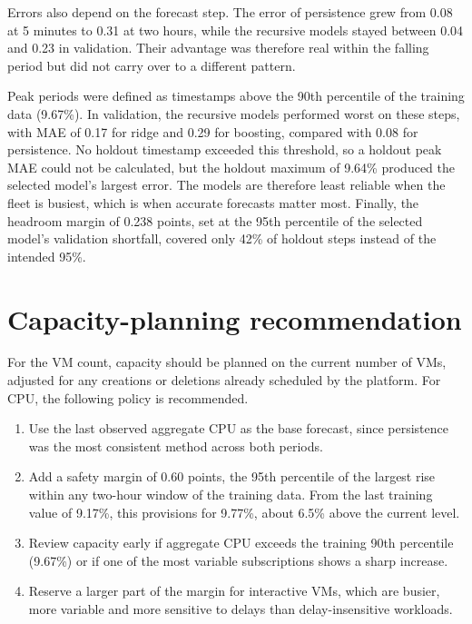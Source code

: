\documentclass[11pt,a4paper]{article}
\begin{document}
Errors also depend on the forecast step. The error of persistence grew from 0.08 at 5 minutes to 0.31 at two hours, while the recursive models stayed between 0.04 and 0.23 in validation. Their advantage was therefore real within the falling period but did not carry over to a different pattern.

Peak periods were defined as timestamps above the 90th percentile of the training data (9.67\%). In validation, the recursive models performed worst on these steps, with MAE of 0.17 for ridge and 0.29 for boosting, compared with 0.08 for persistence. No holdout timestamp exceeded this threshold, so a holdout peak MAE could not be calculated, but the holdout maximum of 9.64\% produced the selected model's largest error. The models are therefore least reliable when the fleet is busiest, which is when accurate forecasts matter most. Finally, the headroom margin of 0.238 points, set at the 95th percentile of the selected model's validation shortfall, covered only 42\% of holdout steps instead of the intended 95\%.

\section{Capacity-planning recommendation}

For the VM count, capacity should be planned on the current number of VMs, adjusted for any creations or deletions already scheduled by the platform. For CPU, the following policy is recommended.

\begin{enumerate}
  \item Use the last observed aggregate CPU as the base forecast, since persistence was the most consistent method across both periods.
  \item Add a safety margin of 0.60 points, the 95th percentile of the largest rise within any two-hour window of the training data. From the last training value of 9.17\%, this provisions for 9.77\%, about 6.5\% above the current level.
  \item Review capacity early if aggregate CPU exceeds the training 90th percentile (9.67\%) or if one of the most variable subscriptions shows a sharp increase.
  \item Reserve a larger part of the margin for interactive VMs, which are busier, more variable and more sensitive to delays than delay-insensitive workloads.
\end{enumerate}
\end{document}
